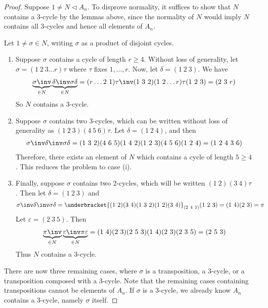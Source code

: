 \begin{proof}
	Suppose $1 \neq N \triangleleft A_n$.
	To disprove normality, it suffices to show that $N$ contains a 3-cycle by the lemmas above, since the normality of $N$ would imply $N$ contains all 3-cycles and hence all elements of $A_n$.

	Let $1 \neq \sigma \in N$, writing $\sigma$ as a product of disjoint cycles.
	\begin{enumerate}
		\item Suppose $\sigma$ contains a cycle of length $r \geq 4$.
		      Without loss of generality, let $\sigma = (1\ 2\ 3\dots r) \tau$ where $\tau$ fixes $1, \dots, r$.
		      Now, let $\delta = (1\ 2\ 3)$.
		      We have
		      \begin{align*}
			      \underbrace{\sigma\inv}_{\in N} \underbrace{\delta\inv \sigma \delta}_{\in N} = (r \dots 2\ 1) \tau\inv (1\ 3\ 2)(1\ 2\dots r) \tau (1\ 2\ 3)= (2\ 3\ r)
		      \end{align*}
		      So $N$ contains a 3-cycle.
		\item Suppose $\sigma$ contains two 3-cycles, which can be written without loss of generality as $(1\ 2\ 3)(4\ 5\ 6) \tau$.
		      Let $\delta = (1\ 2\ 4)$, and then
		      \begin{align*}
			      \sigma\inv \delta\inv \sigma \delta = (1\ 3\ 2)(4\ 6\ 5)(1\ 4\ 2)(1\ 2\ 3)(4\ 5\ 6)(1\ 2\ 4) = (1\ 2\ 4\ 3\ 6)
		      \end{align*}
		      Therefore, there exists an element of $N$ which contains a cycle of length $5 \geq 4$.
		      This reduces the problem to case (i).
		\item Finally, suppose $\sigma$ contains two 2-cycles, which will be written $(1\ 2)(3\ 4)\tau$.
		      Then let $\delta = (1\ 2\ 3)$ and
		      \begin{align*}
			      \sigma\inv \delta\inv \sigma \delta = \underbracket{(1\ 2)(3\ 4)(1\ 3\ 2)(1\ 2)(3\ 4)}_{(2\ 4\ 1)} (1\ 2\ 3) = (1\ 4)(2\ 3) = \pi
		      \end{align*}
		      Let $\varepsilon = (2\ 3\ 5)$.
		      Then
		      \begin{align*}
			      \underbrace{\pi\inv}_{\in N} \underbrace{\varepsilon\inv \pi \varepsilon}_{\in N} = (1\ 4)(2\ 3)(2\ 5\ 3)(1\ 4)(2\ 3)(2\ 3\ 5) = (2\ 5\ 3)
		      \end{align*}
		      Thus $N$ contains a 3-cycle.
	\end{enumerate}
	There are now three remaining cases, where $\sigma$ is a transposition, a 3-cycle, or a transposition composed with a 3-cycle.
	Note that the remaining cases containing transpositions cannot be elements of $A_n$.
	If $\sigma$ is a 3-cycle, we already know $A_n$ contains a 3-cycle, namely $\sigma$ itself.
\end{proof}
